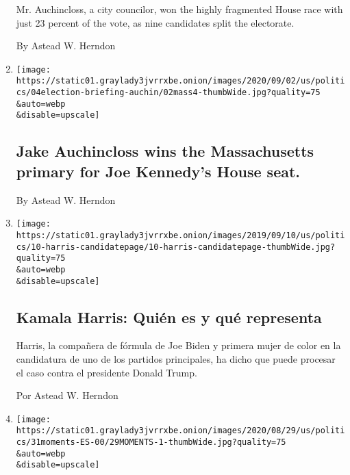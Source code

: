 \begin{enumerate}
  Mr. Auchincloss, a city councilor, won the highly fragmented House
  race with just 23 percent of the vote, as nine candidates split the
  electorate.

  By Astead W. Herndon
\item
  \href{/2020/09/04/us/elections/jake-auchincloss-wins-the-massachusetts-primary-for-joe-kennedys-house-seat.html}{}

  \texttt{[image: https://static01.graylady3jvrrxbe.onion/images/2020/09/02/us/politics/04election-briefing-auchin/02mass4-thumbWide.jpg?quality=75\\\&auto=webp\\\&disable=upscale]}

  \hypertarget{jake-auchincloss-wins-the-massachusetts-primary-for-joe-kennedys-house-seat}{%
  \subsection{Jake Auchincloss wins the Massachusetts primary for Joe
  Kennedy's House
  seat.}\label{jake-auchincloss-wins-the-massachusetts-primary-for-joe-kennedys-house-seat}}

  By Astead W. Herndon
\item
  \href{/es/interactive/2020/09/01/espanol/estados-unidos/kamala-harris-elecciones.html}{}

  \texttt{[image: https://static01.graylady3jvrrxbe.onion/images/2019/09/10/us/politics/10-harris-candidatepage/10-harris-candidatepage-thumbWide.jpg?quality=75\\\&auto=webp\\\&disable=upscale]}

  \hypertarget{kamala-harris-quiuxe9n-es-y-quuxe9-representa}{%
  \subsection{Kamala Harris: Quién es y qué
  representa}\label{kamala-harris-quiuxe9n-es-y-quuxe9-representa}}

  Harris, la compañera de fórmula de Joe Biden y primera mujer de color
  en la candidatura de uno de los partidos principales, ha dicho que
  puede procesar el caso contra el presidente Donald Trump.

  Por Astead W. Herndon
\item
  \href{/es/2020/08/31/espanol/estados-unidos/Joe-biden-donald-trump-campana.html}{}

  \texttt{[image: https://static01.graylady3jvrrxbe.onion/images/2020/08/29/us/politics/31moments-ES-00/29MOMENTS-1-thumbWide.jpg?quality=75\\\&auto=webp\\\&disable=upscale]}

  \hypertarget{anuxe1lisis}{%
}
\end{enumerate}
